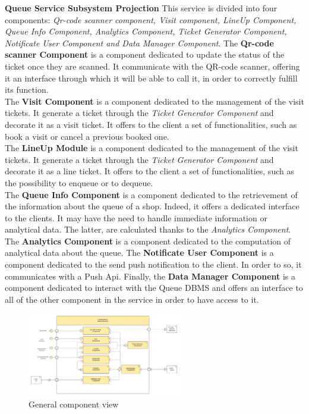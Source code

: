 \textbf{Queue Service Subsystem Projection}
This service is divided into four components: \textit{Qr-code scanner component, Visit component, LineUp Component, Queue Info Component, Analytics Component, Ticket Generator Component, Notificate User Component and Data Manager Component}. 
The \textbf{Qr-code scanner Component} is a component dedicated to update the status of the ticket once they are scanned. It communicate with the QR-code scanner, offering it an interface through which it will be able to call it, in order to correctly fulfill its function.\\
The \textbf{Visit Component} is a component dedicated to the management of the visit tickets. It generate a ticket through the \textit{Ticket Generator Component} and decorate it as a visit ticket. It offers to the client a set of functionalities, such as book a visit or cancel a previous booked one.\\
The \textbf{LineUp Module} is a component dedicated to the management of the visit tickets. It generate a ticket through the \textit{Ticket Generator Component} and decorate it as a line ticket. It offers to the client a set of functionalities, such as the possibility to enqueue or to dequeue.\\
The \textbf{Queue Info Component} is a component dedicated to the retrievement of the information about the queue of a shop.
Indeed, it offers a dedicated interface to the clients. It may have the need to handle immediate information or analytical data. The latter, are calculated thanks to the \textit{Analytics Component}.\\
The \textbf{Analytics Component} is a component dedicated to the computation of analytical data about the queue.
The \textbf{Notificate User Component} is a component dedicated to the send push notification to the client. In order to so, it communicates with a Push Api.
Finally, the \textbf{Data Manager Component} is a component dedicated to interact with the Queue DBMS and offers an interface to all of the other component in the service in order to have access to it.

\begin{figure}[h!]
    \centering
    \includegraphics[width=0.6\textwidth]{Images/ComponentViewQueueService.png}
    \caption{\label{fig:ComponentViewQueueServices}{General component view}}
\end{figure}


